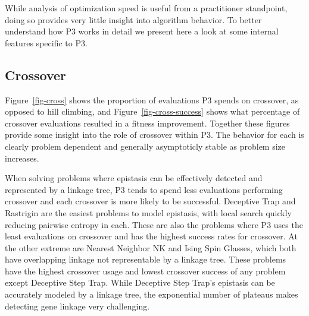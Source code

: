 \documentclass[twoside]{article}
\begin{document}
While analysis of optimization speed is useful from a practitioner standpoint, doing so provides very
little insight into algorithm behavior. To better understand how P3 works in detail we present here
a look at some internal features specific to P3.

\subsection{Crossover}
Figure~\ref{fig-cross} shows the proportion of evaluations P3 spends on crossover, as opposed to hill climbing,
and Figure~\ref{fig-cross-success} shows what percentage of crossover evaluations resulted in a fitness improvement.
Together these figures provide some insight into the role of crossover within P3. The behavior
for each is clearly problem dependent and generally asymptoticly stable as problem size increases.

When solving problems where epistasis can be effectively detected and represented by a linkage tree, P3 tends to spend
less evaluations performing crossover and each crossover is more likely to be successful.
Deceptive Trap and Rastrigin are the easiest problems to model epistasis, with local search quickly
reducing pairwise entropy in each. These are also the problems where P3 uses the least evaluations
on crossover and has the highest success rates for crossover. At the other extreme are Nearest Neighbor
NK and Ising Spin Glasses, which both have overlapping linkage not representable by a linkage tree.
These problems have the highest crossover usage and lowest crossover success of any problem except Deceptive
Step Trap.  While Deceptive Step Trap's epistasis can be accurately modeled by a linkage tree, the
exponential number of plateaus makes detecting gene linkage very challenging.
\end{document}
